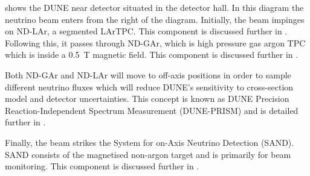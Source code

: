 
 shows the DUNE near detector situated in the detector hall.
In this diagram the neutrino beam enters from the right of the diagram.
Initially, the beam impinges on ND-LAr, a segmented LArTPC. This component is discussed further in .
Following this, it passes through ND-GAr, which is high pressure gas argon TPC which is inside a \SI{0.5}{\tesla} magnetic field. This component is discussed further in .

Both ND-GAr and ND-LAr will move to off-axis positions in order to sample different neutrino fluxes which will reduce DUNE's sensitivity to cross-section model and detector uncertainties.
This concept is known as DUNE Precision Reaction-Independent Spectrum Measurement (DUNE-PRISM) and is detailed further in .

Finally, the beam strikes the System for on-Axis Neutrino Detection (SAND).
SAND consists of the magnetised non-argon target and is primarily for beam monitoring.
This component is discussed further in .

